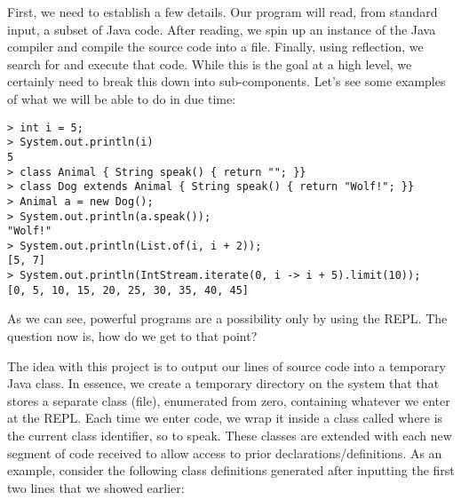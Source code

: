 
First, we need to establish a few details. Our program will read, from standard input, a subset of Java code. After reading, we spin up an instance of the Java compiler and compile the source code into a  file. Finally, using reflection, we search for and execute that code. While this is the goal at a high level, we certainly need to break this down into sub-components. Let's see some examples of what we will be able to do in due time:

\begin{verbatim}
> int i = 5;
> System.out.println(i)
5
> class Animal { String speak() { return ""; }}
> class Dog extends Animal { String speak() { return "Wolf!"; }}
> Animal a = new Dog();
> System.out.println(a.speak());
"Wolf!"
> System.out.println(List.of(i, i + 2));
[5, 7]
> System.out.println(IntStream.iterate(0, i -> i + 5).limit(10));
[0, 5, 10, 15, 20, 25, 30, 35, 40, 45]
\end{verbatim}

As we can see, powerful programs are a possibility only by using the REPL. The question now is, how do we get to that point?

The idea with this project is to output our lines of source code into a temporary Java class. In essence, we create a temporary directory on the system that that stores a separate class (file), enumerated from zero, containing whatever we enter at the REPL. Each time we enter code, we wrap it inside a class called  where  is the current class identifier, so to speak. These classes are extended with each new segment of code received to allow access to prior declarations/definitions. As an example, consider the following class definitions generated after inputting the first two lines that we showed earlier:

